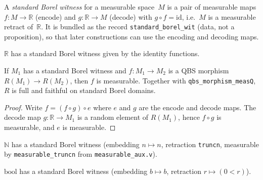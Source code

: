 \begin{definition}\label{def:standard_borel_wit}
  \rocqok
  A \emph{standard Borel witness} for a measurable space~$M$ is a pair of
  measurable maps $f : M \to \mathbb{R}$ (encode) and
  $g : \mathbb{R} \to M$ (decode) with $g \circ f = \mathrm{id}$,
  i.e.\ $M$ is a measurable retract of~$\mathbb{R}$. It is bundled as the
  record \texttt{standard\_borel\_wit} (data, not a proposition), so that
  later constructions can use the encoding and decoding maps.
\end{definition}

\begin{definition}\label{def:R_standard_borel}
  \rocqok
  $\mathbb{R}$ has a standard Borel witness given by the identity
  functions.
\end{definition}

\begin{theorem}\label{thm:R_qbs_full}
  \rocqok
  If $M_1$ has a standard Borel witness and $f : M_1 \to M_2$ is a
  QBS morphism $R(M_1) \to R(M_2)$, then $f$ is measurable.
  Together with \texttt{qbs\_morphism\_measQ}, $R$ is full and faithful on
  standard Borel domains.
\end{theorem}
\begin{proof}
  \rocqok
  Write $f = (f \circ g) \circ e$ where $e$ and $g$ are the encode and
  decode maps. The decode map $g : \mathbb{R} \to M_1$ is a random element
  of $R(M_1)$, hence $f \circ g$ is measurable, and $e$ is measurable.
\end{proof}

\begin{definition}\label{def:nat_standard_borel}
  \rocqok
  $\mathbb{N}$ has a standard Borel witness (embedding $n \mapsto n$,
  retraction \texttt{truncn}, measurable by \texttt{measurable\_truncn}
  from \texttt{measurable\_aux.v}).
\end{definition}

\begin{definition}\label{def:bool_standard_borel}
  \rocqok
  $\mathrm{bool}$ has a standard Borel witness (embedding $b \mapsto b$,
  retraction $r \mapsto (0 < r)$).
\end{definition}

